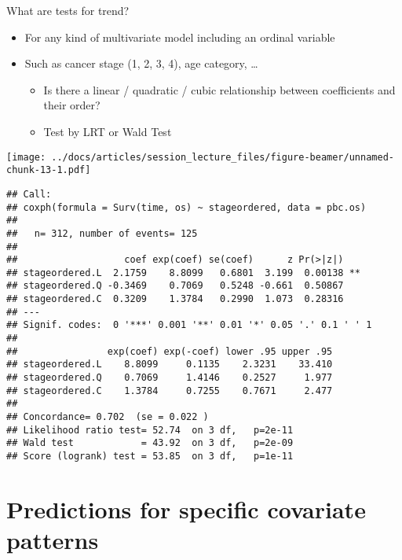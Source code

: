 \documentclass[
  ignorenonframetext,
]{beamer}
\providecommand{\tightlist}{%
  \setlength{\itemsep}{0pt}\setlength{\parskip}{0pt}}
\begin{document}
\begin{frame}[fragile]{What are tests for trend?}

\begin{itemize}
\tightlist
\item
  For any kind of multivariate model including an ordinal variable
\item
  Such as cancer stage (1, 2, 3, 4), age category, \ldots{}

  \begin{itemize}
  \tightlist
  \item
    Is there a linear / quadratic / cubic relationship between
    coefficients and their order?
  \item
    Test by LRT or Wald Test
  \end{itemize}
\end{itemize}

\texttt{[image: ../docs/articles/session\_lecture\_files/figure-beamer/unnamed-chunk-13-1.pdf]}

\begin{verbatim}
## Call:
## coxph(formula = Surv(time, os) ~ stageordered, data = pbc.os)
## 
##   n= 312, number of events= 125 
## 
##                   coef exp(coef) se(coef)      z Pr(>|z|)   
## stageordered.L  2.1759    8.8099   0.6801  3.199  0.00138 **
## stageordered.Q -0.3469    0.7069   0.5248 -0.661  0.50867   
## stageordered.C  0.3209    1.3784   0.2990  1.073  0.28316   
## ---
## Signif. codes:  0 '***' 0.001 '**' 0.01 '*' 0.05 '.' 0.1 ' ' 1
## 
##                exp(coef) exp(-coef) lower .95 upper .95
## stageordered.L    8.8099     0.1135    2.3231    33.410
## stageordered.Q    0.7069     1.4146    0.2527     1.977
## stageordered.C    1.3784     0.7255    0.7671     2.477
## 
## Concordance= 0.702  (se = 0.022 )
## Likelihood ratio test= 52.74  on 3 df,   p=2e-11
## Wald test            = 43.92  on 3 df,   p=2e-09
## Score (logrank) test = 53.85  on 3 df,   p=1e-11
\end{verbatim}

\end{frame}

\hypertarget{predictions-for-specific-covariate-patterns}{%
\section{Predictions for specific covariate
patterns}\label{predictions-for-specific-covariate-patterns}}
\end{document}
